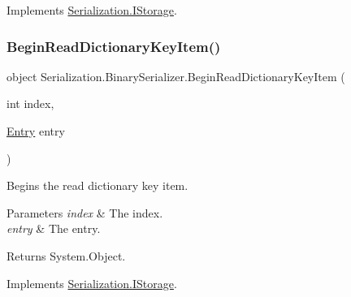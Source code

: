 Implements \hyperlink{interface_serialization_1_1_i_storage_a57c3bee701eba61b73c8ea69f29d3ca3}{Serialization.\+I\+Storage}.

\mbox{\label{class_serialization_1_1_binary_serializer_ae4b30ced98b913465edd4dafb21da8c4}} 
\subsubsection{\texorpdfstring{Begin\+Read\+Dictionary\+Key\+Item()}{BeginReadDictionaryKeyItem()}}
{\footnotesize\ttfamily object Serialization.\+Binary\+Serializer.\+Begin\+Read\+Dictionary\+Key\+Item (\begin{DoxyParamCaption}\item[{int}]{index,  }\item[{\hyperlink{class_serialization_1_1_entry}{Entry}}]{entry }\end{DoxyParamCaption})\hspace{0.3cm}{\ttfamily [inline]}}



Begins the read dictionary key item. 


\begin{DoxyParams}{Parameters}
{\em index} & The index.\\
\hline
{\em entry} & The entry.\\
\hline
\end{DoxyParams}
\begin{DoxyReturn}{Returns}
System.\+Object.
\end{DoxyReturn}


Implements \hyperlink{interface_serialization_1_1_i_storage_a3739c13259528b0042e3e150357638a2}{Serialization.\+I\+Storage}.

\mbox{\label{class_serialization_1_1_binary_serializer_aa91a1c6b09260e35b8342d1254e15d3c}} 
